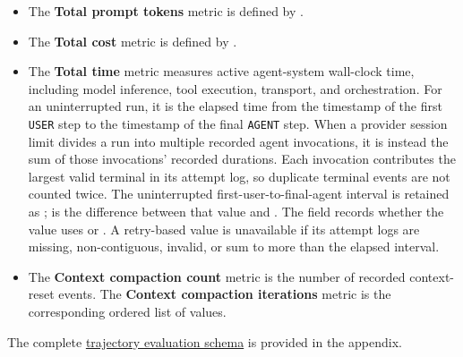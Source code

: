\documentclass[11pt]{article}
\begin{document}
\begin{itemize}
  \item The \textbf{Total prompt tokens} metric is defined by .

  \item The \textbf{Total cost} metric is defined by .
  \item The \textbf{Total time} metric measures active agent-system wall-clock time, including model inference, tool execution, transport, and orchestration.
  For an uninterrupted run, it is the elapsed time from the timestamp of the first \texttt{USER} step to the timestamp of the final \texttt{AGENT} step.
  When a provider session limit divides a run into multiple recorded agent invocations, it is instead the sum of those invocations' recorded durations.
  Each invocation contributes the largest valid terminal  in its attempt log, so duplicate terminal events are not counted twice.
  The uninterrupted first-user-to-final-agent interval is retained as ;  is the difference between that value and .
  The  field records whether the value uses  or .
  A retry-based value is unavailable if its attempt logs are missing, non-contiguous, invalid, or sum to more than the elapsed interval.

  \item The \textbf{Context compaction count} metric is the number of recorded context-reset events.
  The \textbf{Context compaction iterations} metric is the corresponding ordered list of  values.

\end{itemize}

\noindent
The complete \hyperref[sec:trajectory-evaluation-schema-appendix]{trajectory evaluation schema} is provided in the appendix.
\end{document}
